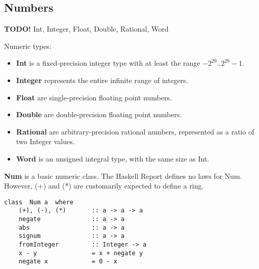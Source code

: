 %

\subsection{Numbers}
\textbf{TODO!}
Int, Integer, Float, Double, Rational, Word

Numeric types:
\begin{itemize}
\item \textbf{Int} is a fixed-precision integer type with at least the range $-2^{29} .. 2^{29}-1$.
\item \textbf{Integer} represents the entire infinite range of integers.
\item \textbf{Float} are single-precision floating point numbers.
\item \textbf{Double} are double-precision floating point numbers.
\item \textbf{Rational} are arbitrary-precision rational numbers, represented as a ratio of two Integer values.
\item \textbf{Word} is an unsigned integral type, with the same size as Int.
\end{itemize}

\textbf{Num} is a basic numeric class.
The Haskell Report defines no laws for Num.
However, (+) and (*) are customarily expected to define a ring.
\begin{verbatim}
class  Num a  where
    (+), (-), (*)       :: a -> a -> a
    negate              :: a -> a
    abs                 :: a -> a
    signum              :: a -> a
    fromInteger         :: Integer -> a
    x - y               = x + negate y
    negate x            = 0 - x
\end{verbatim}








%